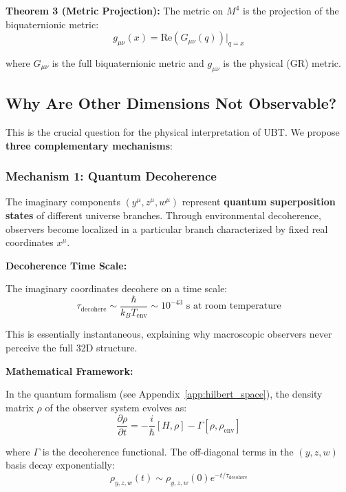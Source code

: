 \textbf{Theorem 3 (Metric Projection):} The metric on $M^4$ is the projection of the biquaternionic metric:
\begin{equation}
g_{\mu\nu}(x) = \text{Re}(G_{\mu\nu}(q))\Big|_{q=x}
\end{equation}

where $G_{\mu\nu}$ is the full biquaternionic metric and $g_{\mu\nu}$ is the physical (GR) metric.

\subsection{Why Are Other Dimensions Not Observable?}

This is the crucial question for the physical interpretation of UBT. We propose \textbf{three complementary mechanisms}:

\subsubsection{Mechanism 1: Quantum Decoherence}

The imaginary components $(y^{\mu}, z^{\mu}, w^{\mu})$ represent \textbf{quantum superposition states} of different universe branches. Through environmental decoherence, observers become localized in a particular branch characterized by fixed real coordinates $x^{\mu}$.

\textbf{Decoherence Time Scale:}

The imaginary coordinates decohere on a time scale:
\begin{equation}
\tau_{\text{decohere}} \sim \frac{\hbar}{k_B T_{\text{env}}} \sim 10^{-43} \text{ s at room temperature}
\end{equation}

This is essentially instantaneous, explaining why macroscopic observers never perceive the full 32D structure.

\textbf{Mathematical Framework:}

In the quantum formalism (see Appendix~\ref{app:hilbert_space}), the density matrix $\rho$ of the observer system evolves as:
\begin{equation}
\frac{\partial \rho}{\partial t} = -\frac{i}{\hbar}[H, \rho] - \Gamma[\rho, \rho_{\text{env}}]
\end{equation}

where $\Gamma$ is the decoherence functional. The off-diagonal terms in the $(y, z, w)$ basis decay exponentially:
\begin{equation}
\rho_{y,z,w}(t) \sim \rho_{y,z,w}(0) e^{-t/\tau_{\text{decohere}}}
\end{equation}

